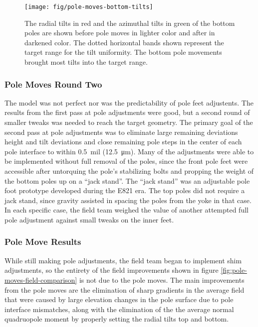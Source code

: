 \begin{figure}
\centering
\texttt{[image: fig/pole-moves-bottom-tilts]}
\caption{
    The radial tilts in red and the azimuthal tilts in green of the bottom poles are shown before pole moves in lighter color and after in darkened color.  The dotted horizontal bands shown represent the target range for the tilt uniformity.  The bottom pole movements brought most tilts into the target range. 
    \label{fig:pole-moves-bottom-tilts}
}
\end{figure}

\subsubsection{Pole Moves Round Two}

The model was not perfect nor was the predictability of pole feet adjustents.  The results from the first pass at pole adjustments were good, but a second round of smaller tweaks was needed to reach the target geometry.  The primary goal of the second pass at pole adjustments was to eliminate large remaining deviations height and tilt deviations and close remaining pole steps in the center of each pole interface to within \SI{0.5}{mil} (\SI{12.5}{\micro\meter}).  Many of the adjustments were able to be implemented without full removal of the poles, since the front pole feet were accessible after untorquing the pole's stabilizing bolts and propping the weight of the bottom poles up on a ``jack stand''.  The ``jack stand'' was an adjustable pole foot prototype developed during the E821 era.  The top poles did not require a jack stand, since gravity assisted in spacing the poles from the yoke in that case.  In each specific case, the field team weighed the value of another attempted full pole adjustment against small tweaks on the inner feet.

\subsubsection{Pole Move Results}

While still making pole adjustments, the field team began to implement shim adjustments, so the entirety of the field improvements shown in figure \ref{fig:pole-moves-field-comparison} is not due to the pole moves.  The main improvements from the pole moves are the elimination of sharp gradients in the average field that were caused by large elevation changes in the pole surface due to pole interface mismatches, along with the elimination of the the average normal quadruopole moment by properly setting the radial tilts top and bottom.

